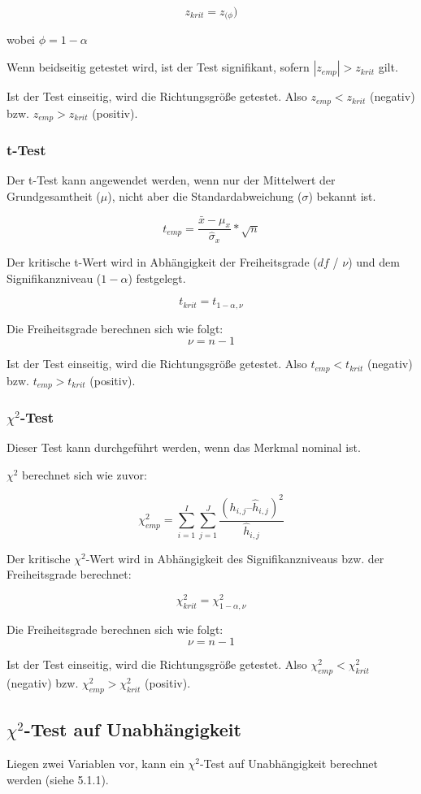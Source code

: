 \documentclass[11pt,a4paper]{article}
\begin{document}
$$z_{krit} = z_{(\phi})$$

wobei $\phi = 1 - \alpha$

Wenn beidseitig getestet wird, ist der Test signifikant, sofern $|z_{emp}| > z_{krit}$ gilt.

Ist der Test einseitig, wird die Richtungsgröße getestet. Also $z_{emp} < z_{krit}$ (negativ) bzw. $z_{emp} > z_{krit}$ (positiv).

\subsubsection{t-Test}
Der t-Test kann angewendet werden, wenn nur der Mittelwert der Grundgesamtheit ($\mu$), nicht aber die Standardabweichung ($\sigma$) bekannt ist.

$$t_{emp} = \frac{\bar{x} - \mu_x}{\hat{\sigma}_x} * \sqrt{n}$$

Der kritische t-Wert wird in Abhängigkeit der Freiheitsgrade ($df$ / $\nu$) und dem Signifikanzniveau ($1 - \alpha$) festgelegt. 

$$t_{krit} = t_{1-\alpha, \nu}$$

Die Freiheitsgrade berechnen sich wie folgt:
$$\nu = n -1$$

Ist der Test einseitig, wird die Richtungsgröße getestet. Also $t_{emp} < t_{krit}$ (negativ) bzw. $t_{emp} > t_{krit}$ (positiv).

\subsubsection{\texorpdfstring{$\chi^2$}{Chi-Qudrat}-Test}
Dieser Test kann durchgeführt werden, wenn das Merkmal nominal ist. 

$\chi^2$ berechnet sich wie zuvor:

$$\chi^2_{emp} = \sum_{i=1}^I \sum_{j=1}^J \frac{(h_{i, j} – \hat{h}_{i, j})^2}{\hat{h}_{i, j}}$$ 

Der kritische $\chi^2$-Wert wird in Abhängigkeit des Signifikanzniveaus bzw. der Freiheitsgrade berechnet:

$$\chi^2_{krit} = \chi^2_{1-\alpha, \nu}$$

Die Freiheitsgrade berechnen sich wie folgt:
$$\nu = n -1$$

Ist der Test einseitig, wird die Richtungsgröße getestet. Also $\chi^2_{emp} < \chi^2_{krit}$ (negativ) bzw. $\chi^2_{emp} > \chi^2_{krit}$ (positiv).

\subsection{\texorpdfstring{$\chi^2$}{Chi-Quadrat}-Test auf Unabhängigkeit}
Liegen zwei Variablen vor, kann ein $\chi^2$-Test auf Unabhängigkeit berechnet werden (siehe 5.1.1).
\end{document}

